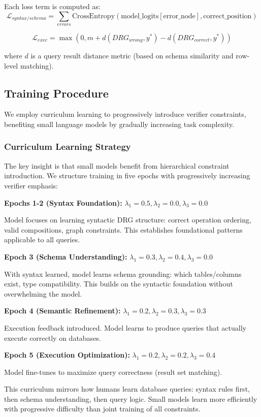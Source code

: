 \documentclass[conference]{IEEEtran}
\begin{document}
Each loss term is computed as:
\[
\mathcal{L}_{syntax/schema} = \sum_{errors} \text{CrossEntropy}(\text{model\_logits}[\text{error\_node}], \text{correct\_position})
\]

\[
\mathcal{L}_{exec} = \max(0, m + d(DRG_{wrong}, y^*) - d(DRG_{correct}, y^*))
\]

where $d$ is a query result distance metric (based on schema similarity and row-level matching).

\subsection{Training Procedure}
\label{sec:training}

We employ curriculum learning to progressively introduce verifier constraints, benefiting small language models by gradually increasing task complexity.

\subsubsection{Curriculum Learning Strategy}

The key insight is that small models benefit from hierarchical constraint introduction. We structure training in five epochs with progressively increasing verifier emphasis:

\textbf{Epochs 1-2 (Syntax Foundation):} $\lambda_1=0.5, \lambda_2=0.0, \lambda_3=0.0$

Model focuses on learning syntactic DRG structure: correct operation ordering, valid compositions, graph constraints. This establishes foundational patterns applicable to all queries.

\textbf{Epoch 3 (Schema Understanding):} $\lambda_1=0.3, \lambda_2=0.4, \lambda_3=0.0$

With syntax learned, model learns schema grounding: which tables/columns exist, type compatibility. This builds on the syntactic foundation without overwhelming the model.

\textbf{Epoch 4 (Semantic Refinement):} $\lambda_1=0.2, \lambda_2=0.3, \lambda_3=0.3$

Execution feedback introduced. Model learns to produce queries that actually execute correctly on databases.

\textbf{Epoch 5 (Execution Optimization):} $\lambda_1=0.2, \lambda_2=0.2, \lambda_3=0.4$

Model fine-tunes to maximize query correctness (result set matching).

This curriculum mirrors how humans learn database queries: syntax rules first, then schema understanding, then query logic. Small models learn more efficiently with progressive difficulty than joint training of all constraints.
\end{document}
